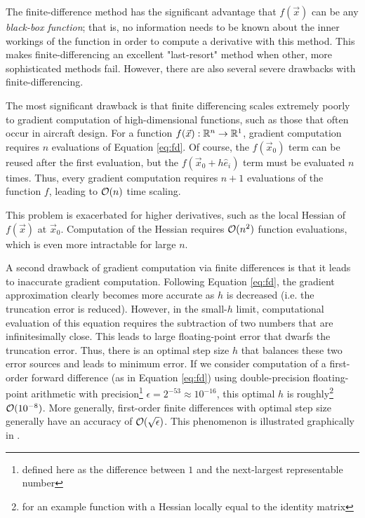 The finite-difference method has the significant advantage that $f(\vec{x})$ can be any \textit{black-box function}; that is, no information needs to be known about the inner workings of the function in order to compute a derivative with this method. This makes finite-differencing an excellent "last-resort" method when other, more sophisticated methods fail. However, there are also several severe drawbacks with finite-differencing.

The most significant drawback is that finite differencing scales extremely poorly to gradient computation of high-dimensional functions, such as those that often occur in aircraft design. For a function $f(\vec{x}): \mathbb{R}^n \to \mathbb{R}^1$, gradient computation requires $n$ evaluations of Equation \ref{eq:fd}. Of course, the $f(\vec{x}_0)$ term can be reused after the first evaluation, but the $f(\vec{x}_0+h\hat{e}_i)$ term must be evaluated $n$ times. Thus, every gradient computation requires $n+1$ evaluations of the function $f$, leading to $\mathcal{O}(n)$ time scaling.

This problem is exacerbated for higher derivatives, such as the local Hessian of $f(\vec{x})$ at $\vec{x}_0$. Computation of the Hessian requires $\mathcal{O}(n^2)$ function evaluations, which is even more intractable for large $n$.

A second drawback of gradient computation via finite differences is that it leads to inaccurate gradient computation. Following Equation \ref{eq:fd}, the gradient approximation clearly becomes more accurate as $h$ is decreased (i.e. the truncation error is reduced). However, in the small-$h$ limit, computational evaluation of this equation requires the subtraction of two numbers that are infinitesimally close. This leads to large floating-point error that dwarfs the truncation error. Thus, there is an optimal step size $h$ that balances these two error sources and leads to minimum error. If we consider computation of a first-order forward difference (as in Equation \ref{eq:fd}) using double-precision floating-point arithmetic with precision\footnote{defined here as the difference between $1$ and the next-largest representable number} $\epsilon = 2^{-53} \approx 10^{-16}$, this optimal $h$ is roughly\footnote{for an example function with a Hessian locally equal to the identity matrix} $\mathcal{O}(10^{-8})$. More generally, first-order finite differences with optimal step size generally have an accuracy of $\mathcal{O}(\sqrt{\epsilon})$. This phenomenon is illustrated graphically in \cite{mdobook}.

